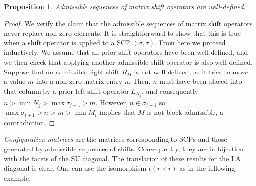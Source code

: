 \documentclass{amsart}
\newcommand{\darkblue}{\color{darkblue}} %
\newtheorem{proposition}[theorem]{Proposition}
\theoremstyle{definition}
\newcommand{\defn}[1]{\textsl{\darkblue #1}} %
\newcommand{\SU}{\mathrm{SU}}
\newcommand{\LA}{\mathrm{LA}}
\newcommand{\SCP}{\mathrm{SCP}}
\begin{document}
\begin{proposition}
Admissible sequences of matrix shift operators are well-defined.
\end{proposition}

\begin{proof}
We verify the claim that the admissible sequences of matrix shift operators never replace non-zero elements.
It is straightforward to show that this is true when a shift operator is applied to a $\SCP$ $(\sigma,\tau)$.
From here we proceed inductively.
We assume that all prior shift operators have been well-defined, and we then check that applying another admissible shift operator is also well-defined.
Suppose that an admissible right shift $R_{M}$ is not well-defined, as it tries to move a value $m$ into a non-zero matrix entry $n$.
Then, $n$ must have been placed into that column by a prior left shift operator $L_{N_j}$, and consequently $n>\min N_j > \max \tau_{j-1}> m$.
However, $n\in \sigma_{i+1}$ so $\max \sigma_{i+1}>n>m>\min M_i $ implies that $M$ is not block-admissible, a contradiction.
\end{proof}

\defn{Configuration matrices} \cite[Def. 7]{SaneblidzeUmble} are the matrices corresponding to $\SCP$s and those generated by admissible sequences of shifts.
Consequently, they are in bijection with the facets of the $\SU$ diagonal.
The translation of these results for the $\LA$ diagonal is clear.
One can use the isomorphism $t(r\times r)$ as in the following example. 
\end{document}
